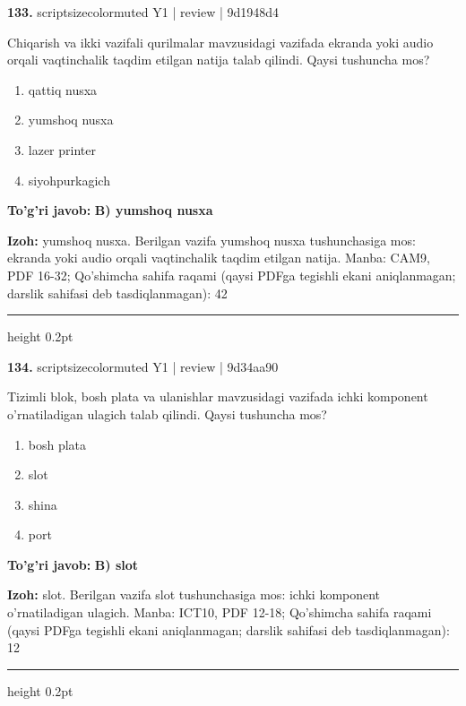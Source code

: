 \documentclass[10pt,a4paper]{article}
\begin{document}
{\bfseries\sffamily\color{ink} 133.} {scriptsizecolor{muted} Y1 | review | 9d1948d4}
\par
Chiqarish va ikki vazifali qurilmalar mavzusidagi vazifada ekranda yoki audio orqali vaqtinchalik taqdim etilgan natija talab qilindi. Qaysi tushuncha mos?
\begin{enumerate}[label=\Alph*),leftmargin=9mm]
\item qattiq nusxa
\item yumshoq nusxa
\item lazer printer
\item siyohpurkagich
\end{enumerate}
\begin{tcolorbox}[enhanced,breakable,colback=teal!4,colframe=teal!60!black,boxrule=0.45pt,arc=1.2mm,left=2.7mm,right=2.7mm,top=1.8mm,bottom=1.8mm,before skip=2mm,after skip=2mm]
{\bfseries\sffamily\color{teal}To'g'ri javob:} \textbf{B) yumshoq nusxa}
\par\smallskip
{\bfseries Izoh:} yumshoq nusxa. Berilgan vazifa yumshoq nusxa tushunchasiga mos: ekranda yoki audio orqali vaqtinchalik taqdim etilgan natija. Manba: CAM9, PDF 16-32; Qo'shimcha sahifa raqami (qaysi PDFga tegishli ekani aniqlanmagan; darslik sahifasi deb tasdiqlanmagan): 42
\end{tcolorbox}
\vspace{2mm}\hrule height 0.2pt\vspace{3mm}

{\bfseries\sffamily\color{ink} 134.} {scriptsizecolor{muted} Y1 | review | 9d34aa90}
\par
Tizimli blok, bosh plata va ulanishlar mavzusidagi vazifada ichki komponent o'rnatiladigan ulagich talab qilindi. Qaysi tushuncha mos?
\begin{enumerate}[label=\Alph*),leftmargin=9mm]
\item bosh plata
\item slot
\item shina
\item port
\end{enumerate}
\begin{tcolorbox}[enhanced,breakable,colback=teal!4,colframe=teal!60!black,boxrule=0.45pt,arc=1.2mm,left=2.7mm,right=2.7mm,top=1.8mm,bottom=1.8mm,before skip=2mm,after skip=2mm]
{\bfseries\sffamily\color{teal}To'g'ri javob:} \textbf{B) slot}
\par\smallskip
{\bfseries Izoh:} slot. Berilgan vazifa slot tushunchasiga mos: ichki komponent o'rnatiladigan ulagich. Manba: ICT10, PDF 12-18; Qo'shimcha sahifa raqami (qaysi PDFga tegishli ekani aniqlanmagan; darslik sahifasi deb tasdiqlanmagan): 12
\end{tcolorbox}
\vspace{2mm}\hrule height 0.2pt\vspace{3mm}
\end{document}
